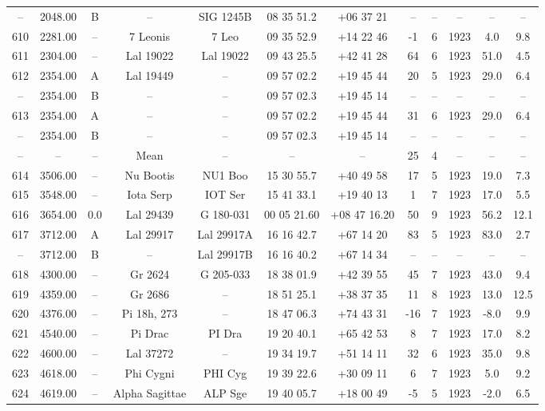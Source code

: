 \begin{table}
\begin{tabular}{cccccccccccc}
-- & 2048.00 & B & -- & SIG 1245B & 08 35 51.2 & +06 37 21 & -- & -- & -- & -- & -- \\
610 & 2281.00 & -- & 7 Leonis & 7 Leo & 09 35 52.9 & +14 22 46 & -1 & 6 & 1923 & 4.0 & 9.8 \\
611 & 2304.00 & -- & Lal 19022 & Lal 19022 & 09 43 25.5 & +42 41 28 & 64 & 6 & 1923 & 51.0 & 4.5 \\
612 & 2354.00 & A & Lal 19449 & -- & 09 57 02.2 & +19 45 44 & 20 & 5 & 1923 & 29.0 & 6.4 \\
-- & 2354.00 & B & -- & -- & 09 57 02.3 & +19 45 14 & -- & -- & -- & -- & -- \\
613 & 2354.00 & A & -- & -- & 09 57 02.2 & +19 45 44 & 31 & 6 & 1923 & 29.0 & 6.4 \\
-- & 2354.00 & B & -- & -- & 09 57 02.3 & +19 45 14 & -- & -- & -- & -- & -- \\
-- & -- & -- & Mean & -- & -- & -- & 25 & 4 & -- & -- & -- \\
614 & 3506.00 & -- & Nu Bootis & NU1 Boo & 15 30 55.7 & +40 49 58 & 17 & 5 & 1923 & 19.0 & 7.3 \\
615 & 3548.00 & -- & Iota Serp & IOT Ser & 15 41 33.1 & +19 40 13 & 1 & 7 & 1923 & 17.0 & 5.5 \\
616 & 3654.00 & 0.0 & Lal 29439 & G 180-031 & 00 05 21.60 & +08 47 16.20 & 50 & 9 & 1923 & 56.2 & 12.1 \\
617 & 3712.00 & A & Lal 29917 & Lal 29917A & 16 16 42.7 & +67 14 20 & 83 & 5 & 1923 & 83.0 & 2.7 \\
-- & 3712.00 & B & -- & Lal 29917B & 16 16 40.2 & +67 14 34 & -- & -- & -- & -- & -- \\
618 & 4300.00 & -- & Gr 2624 & G 205-033 & 18 38 01.9 & +42 39 55 & 45 & 7 & 1923 & 43.0 & 9.4 \\
619 & 4359.00 & -- & Gr 2686 & -- & 18 51 25.1 & +38 37 35 & 11 & 8 & 1923 & 13.0 & 12.5 \\
620 & 4376.00 & -- & Pi 18h, 273 & -- & 18 47 06.3 & +74 43 31 & -16 & 7 & 1923 & -8.0 & 9.9 \\
621 & 4540.00 & -- & Pi Drac & PI Dra & 19 20 40.1 & +65 42 53 & 8 & 7 & 1923 & 17.0 & 8.2 \\
622 & 4600.00 & -- & Lal 37272 & -- & 19 34 19.7 & +51 14 11 & 32 & 6 & 1923 & 35.0 & 9.8 \\
623 & 4618.00 & -- & Phi Cygni & PHI Cyg & 19 39 22.6 & +30 09 11 & 6 & 7 & 1923 & 5.0 & 9.2 \\
624 & 4619.00 & -- & Alpha Sagittae & ALP Sge & 19 40 05.7 & +18 00 49 & -5 & 5 & 1923 & -2.0 & 6.5 \\

\end{tabular}
\end{table}
